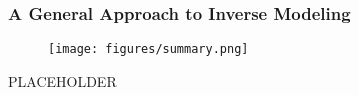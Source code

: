 \documentclass[usenames,dvipsnames]{beamer}
\begin{document}
\begin{frame}
	\frametitle{A General Approach to Inverse Modeling}
	\begin{figure}[hbt]
		\texttt{[image: figures/summary.png]}
	\end{figure}
\end{frame}

\begin{frame}
PLACEHOLDER
\end{frame}



\end{document}
